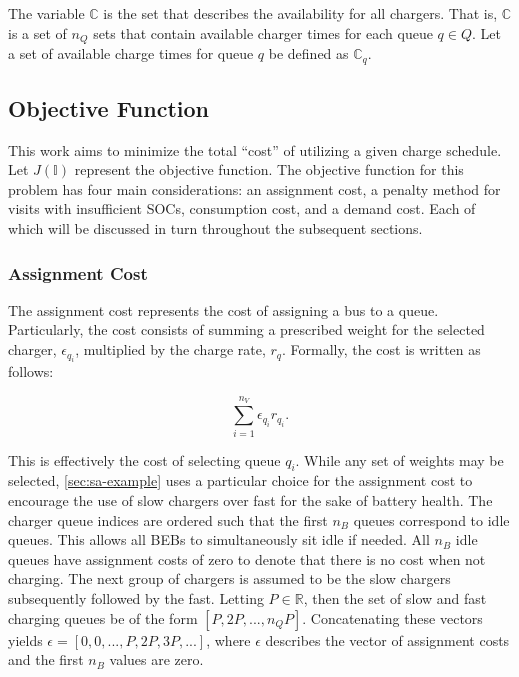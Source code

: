 \documentclass[energies,article,submit,moreauthors]{Definitions/mdpi}
\newcommand{\I}{\mathbb{I}}                 %
\newcommand{\C}{\mathbb{C}}                 %
\begin{document}
The variable \(\C\) is the set that describes the availability for all chargers. That is, \(\C\) is a set of \(n_Q\) sets that
contain available charger times for each queue \(q \in Q\). Let a set of available charge times for queue \(q\) be defined as
\(\C_q\).

\subsection{Objective Function}
\label{sec:sa-objective-function}
This work aims to minimize the total ``cost'' of utilizing a given charge schedule. Let \(J(\I)\) represent the objective
function. The objective function for this problem has four main considerations: an assignment cost, a penalty method for
visits with insufficient SOCs, consumption cost, and a demand cost. Each of which will be discussed in turn throughout
the subsequent sections.

\subsubsection{Assignment Cost}
\label{sec:sa-assignment-cost}
The assignment cost represents the cost of assigning a bus to a queue. Particularly, the cost consists of summing a
prescribed weight for the selected charger, \(\epsilon_{q_i}\), multiplied by the charge rate, \(r_q\). Formally, the cost is
written as follows:

\begin{equation}
\label{eq:assignment-cost}
\sum_{i=1}^{n_V} \epsilon_{q_i}r_{q_i}\text{.}
\end{equation}

This is effectively the cost of selecting queue \(q_i\). While any set of weights may be selected, \ref{sec:sa-example} uses a
particular choice for the assignment cost to encourage the use of slow chargers over fast for the sake of battery
health. The charger queue indices are ordered such that the first \(n_B\) queues correspond to idle queues. This allows
all BEBs to simultaneously sit idle if needed. All \(n_B\) idle queues have assignment costs of zero to denote that there
is no cost when not charging. The next group of chargers is assumed to be the slow chargers subsequently followed by the
fast. Letting \(P \in \mathbb{R}\), then the set of slow and fast charging queues be of the form \([P, 2P, ..., n_QP]\). Concatenating
these vectors yields \(\epsilon = [0, 0, ..., P, 2P, 3P, ...]\), where \(\epsilon\) describes the vector of assignment costs and the first
\(n_B\) values are zero.
\end{document}
